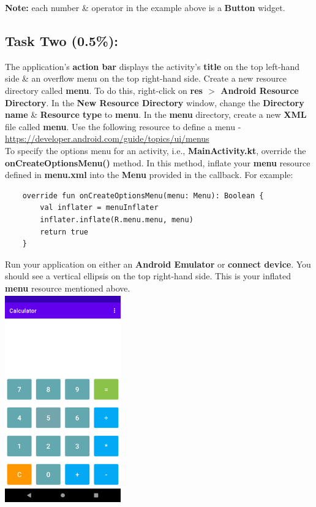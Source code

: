 \documentclass{article}
\begin{document}
\textbf{Note:} each number \& operator in the example above is a \textbf{Button} widget.

\subsection*{Task Two (0.5\%):} 
The application's \textbf{action bar} displays the activity's \textbf{title} on the top left-hand side \& an overflow menu on the top right-hand side. Create a new resource directory called \textbf{menu}. To do this, right-click on \textbf{res $>$ Android Resource Directory}. In the \textbf{New Resource Directory} window, change the \textbf{Directory name} \& \textbf{Resource type} to \textbf{menu}. In the \textbf{menu} directory, create a new \textbf{XML} file called \textbf{menu}. Use the following resource to define a menu - \href{https://developer.android.com/guide/topics/ui/menus}{https://developer.android.com/guide/topics/ui/menus} \\

To specify the options menu for an activity, i.e., \textbf{MainActivity.kt}, override the \textbf{onCreateOptionsMenu()} method. In this method, inflate your \textbf{menu} resource defined in \textbf{menu.xml} into the \textbf{Menu} provided in the callback. For example:

\begin{verbatim}
    override fun onCreateOptionsMenu(menu: Menu): Boolean {
        val inflater = menuInflater
        inflater.inflate(R.menu.menu, menu)
        return true
    }
\end{verbatim}

Run your application on either an \textbf{Android Emulator} or \textbf{connect device}. You should see a vertical ellipsis on the top right-hand side. This is your inflated \textbf{menu} resource mentioned above. \\

\includegraphics[width=5cm, height=9cm]{../tex/img/practicals/02-calculator-2.png}
\end{document}
